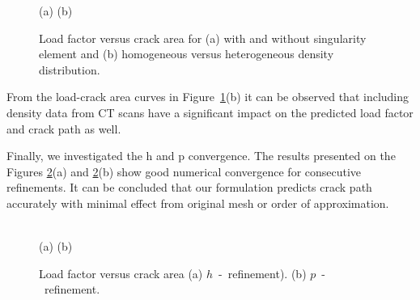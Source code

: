 \documentclass[onecolumn]{svjour3}
\begin{document}
\begin{figure}[h]
	\centering
	\begin{minipage}{.45\textwidth}
\end{minipage}%
\quad
\begin{minipage}{.45\textwidth}
\end{minipage}

(a) \hspace{5cm} (b)
	\caption{Load factor versus crack area for (a) with and without singularity element and (b) homogeneous versus heterogeneous density distribution.}
	\label{fig:load_factor1}
\end{figure}
From the load-crack area curves in Figure~\ref{fig:load_factor1}(b) it can be observed that including density data from CT scans have a significant impact on the predicted load factor and crack path as well. 


Finally, we investigated the h and p convergence. The results presented on the Figures \ref{fig:load_factor2}(a) and \ref{fig:load_factor2}(b) show good numerical convergence for consecutive refinements. It can be concluded that our formulation predicts crack path accurately with minimal effect from original mesh or order of approximation. 

\begin{figure}[h]
	\centering
	\begin{minipage}{.45\textwidth}
	\end{minipage}%
	\begin{minipage}{.45\textwidth}
	\end{minipage} \\
	(a)\hspace{5cm} (b)
			 \caption{Load factor versus crack area (a) $h$~-~refinement). (b) $p$~-~refinement.}
		 \label{fig:load_factor2}
	\end{figure}
\end{document}
